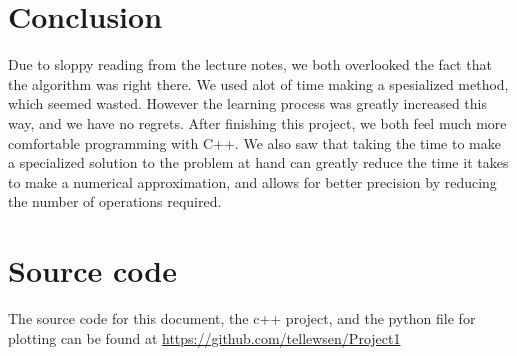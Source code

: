 \documentclass[a4paper,12pt]{article}
\begin{document}
\section{Conclusion}
Due to sloppy reading from the lecture notes, we both overlooked the fact that the algorithm was right there. We used alot of time making a spesialized method, which seemed wasted. However the learning process was greatly increased this way, and we have no regrets. After finishing this project, we both feel much more comfortable programming with C++. 
We also saw that taking the time to make a specialized solution to the problem at hand can greatly reduce the time it takes to make a numerical approximation, and allows for better precision by reducing the number of operations required.
\section{Source code}
The source code for this document, the c++ project, and the python file for plotting can be found at \url{https://github.com/tellewsen/Project1}
\end{document}
